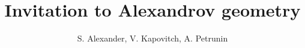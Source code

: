 \documentclass[twoside]{book}
\begin{document}
\frontmatter
\title{Invitation to Alexandrov geometry}
\author{S. Alexander, V. Kapovitch, A. Petrunin}
\maketitle
\thispagestyle{empty}
\newpage
\tableofcontents







{\small

}

\end{document}
